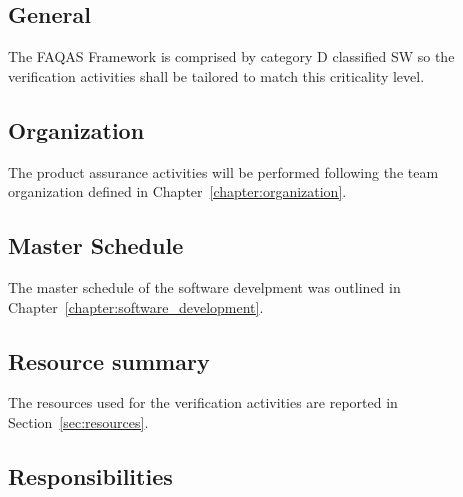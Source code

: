 \subsection{General}

The FAQAS Framework is comprised by category D classified SW so the verification activities shall be tailored to match this criticality level.


\subsection{Organization}

The product assurance activities will be performed following the team organization defined in Chapter~\ref{chapter:organization}.

\subsection{Master Schedule}

The master schedule of the software develpment was outlined in Chapter~\ref{chapter:software_development}.

\subsection{Resource summary}

The resources used for the verification activities are reported in Section~\ref{sec:resources}.

\subsection{Responsibilities}

